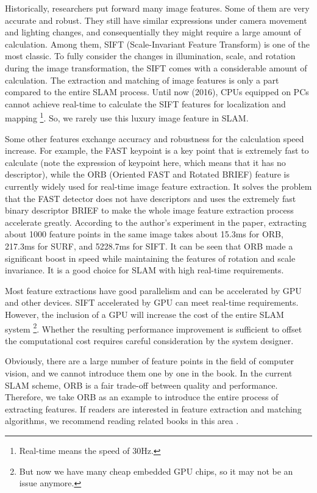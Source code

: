 Historically, researchers put forward many image features. Some of them are very accurate and robust. They still have similar expressions under camera movement and lighting changes, and consequentially they might require a large amount of calculation. Among them, SIFT (Scale-Invariant Feature Transform) is one of the most classic. To fully consider the changes in illumination, scale, and rotation during the image transformation, the SIFT comes with a considerable amount of calculation. The extraction and matching of image features is only a part compared to the entire SLAM process. Until now (2016), CPUs equipped on PCs cannot achieve real-time to calculate the SIFT features for localization and mapping \footnote{Real-time means the speed of 30Hz. }. So, we rarely use this luxury image feature in SLAM.

Some other features exchange accuracy and robustness for the calculation speed increase. For example, the FAST keypoint is a key point that is extremely fast to calculate (note the expression of keypoint here, which means that it has no descriptor), while the ORB (Oriented FAST and Rotated BRIEF) feature is currently widely used for real-time image feature extraction. It solves the problem that the FAST detector  {\cite{Rosten2006}} does not have descriptors and uses the extremely fast binary descriptor BRIEF {\cite{calonder2010brief}} to make the whole image feature extraction process accelerate greatly. According to the author's experiment in the paper, extracting about 1000 feature points in the same image takes about 15.3ms for ORB, 217.3ms for SURF, and 5228.7ms for SIFT. It can be seen that ORB made a significant boost in speed while maintaining the features of rotation and scale invariance. It is a good choice for SLAM with high real-time requirements.

Most feature extractions have good parallelism and can be accelerated by GPU and other devices. SIFT accelerated by GPU can meet real-time requirements. However, the inclusion of a GPU will increase the cost of the entire SLAM system \footnote{But now we have many cheap embedded GPU chips, so it may not be an issue anymore.}. Whether the resulting performance improvement is sufficient to offset the computational cost requires careful consideration by the system designer.

Obviously, there are a large number of feature points in the field of computer vision, and we cannot introduce them one by one in the book. In the current SLAM scheme, ORB is a fair trade-off between quality and performance. Therefore, we take ORB as an example to introduce the entire process of extracting features. If readers are interested in feature extraction and matching algorithms, we recommend reading related books in this area \cite{Nixon2012}.

